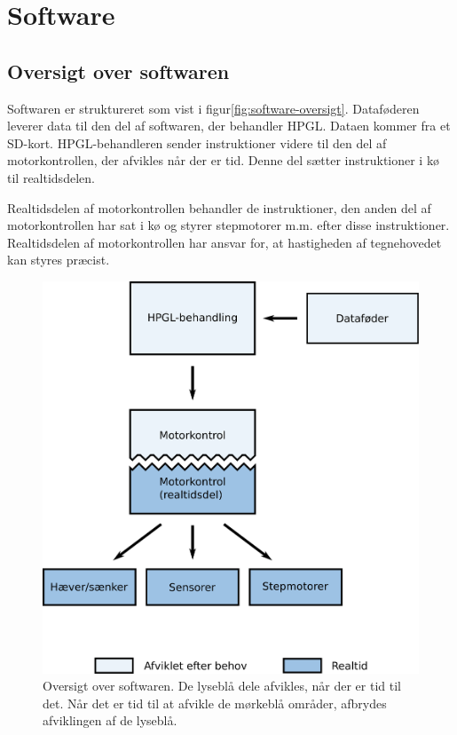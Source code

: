 \chapter[Implementering af software]{Software}



\section{Oversigt over softwaren}


Softwaren er struktureret som vist i
figur\vref{fig:software-oversigt}. Dataføderen leverer data til den
del af softwaren, der behandler HPGL. Dataen kommer fra et
SD-kort. HPGL-behandleren sender instruktioner videre til den del af
motorkontrollen, der afvikles når der er tid. Denne del sætter
instruktioner i kø til realtidsdelen.

Realtidsdelen af motorkontrollen behandler de instruktioner, den anden
del af motorkontrollen har sat i kø og styrer stepmotorer m.m. efter
disse instruktioner. Realtidsdelen af motorkontrollen har ansvar for,
at hastigheden af tegnehovedet kan styres præcist.


\begin{figure}[htbp]
  \centering
  \includegraphics[width=.75\textwidth]{../brugere/kjaergaard/software-oversigt}
  \caption{Oversigt over softwaren. De lyseblå dele afvikles, når der
    er tid til det. Når det er tid til at afvikle de mørkeblå områder,
    afbrydes afviklingen af de lyseblå.}
  \label{fig:software-oversigt}
\end{figure}



